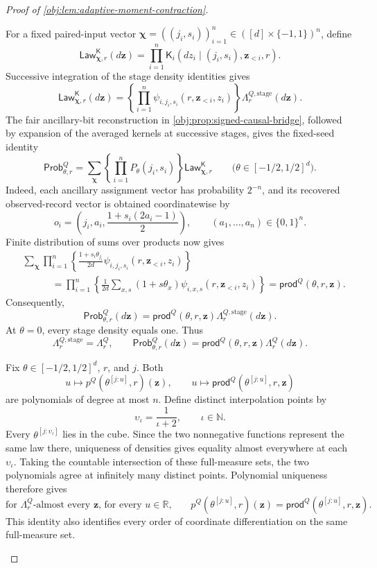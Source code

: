 \begin{proof}[Proof of \cref{obj:lem:adaptive-moment-contraction}]
\begin{enumerate}
For a fixed paired-input vector
\(\boldsymbol\chi=((j_i,s_i))_{i=1}^n
 \in([d]\times\{-1,1\})^n\), define
\[
\mathsf{Law}^{\mathsf K}_{\boldsymbol\chi,r}(d\mathbf z)
=\prod_{i=1}^n
 \mathsf K_i(dz_i\mid(j_i,s_i),\mathbf z_{<i},r).
\]
Successive integration of the stage density identities gives
\[
\mathsf{Law}^{\mathsf K}_{\boldsymbol\chi,r}(d\mathbf z)
=
\left\{\prod_{i=1}^n
 \psi_{i,j_i,s_i}(r,\mathbf z_{<i},z_i)\right\}
 \Lambda_r^{Q,\mathrm{stage}}(d\mathbf z).
\]
The fair ancillary-bit reconstruction in
\cref{obj:prop:signed-causal-bridge}, followed by expansion of the averaged kernels at successive stages, gives the fixed-seed identity
\[
\mathsf{Prob}^Q_{\theta,r}
=
\sum_{\boldsymbol\chi}
 \left\{\prod_{i=1}^nP_\theta(j_i,s_i)\right\}
 \mathsf{Law}^{\mathsf K}_{\boldsymbol\chi,r}
\qquad
\bigl(\theta\in[-1/2,1/2]^d\bigr).
\]
Indeed, each ancillary assignment vector has probability \(2^{-n}\), and its recovered observed-record vector is obtained coordinatewise by
\[
o_i
=\left(j_i,a_i,\frac{1+s_i(2a_i-1)}2\right),
\qquad
(a_1,\ldots,a_n)\in\{0,1\}^n.
\]
Finite distribution of sums over products now gives
\[
\begin{split}
&\sum_{\boldsymbol\chi}
 \prod_{i=1}^n
 \left\{
 \frac{1+s_i\theta_{j_i}}{2d}
 \psi_{i,j_i,s_i}(r,\mathbf z_{<i},z_i)
 \right\}\\
&\hspace{3em}
=\prod_{i=1}^n
 \left\{\frac1{2d}\sum_{x,s}
 (1+s\theta_x)\psi_{i,x,s}(r,\mathbf z_{<i},z_i)\right\}
=\mathsf{prod}^Q(\theta,r,\mathbf z).
\end{split}
\]
Consequently,
\[
\mathsf{Prob}^Q_{\theta,r}(d\mathbf z)
=\mathsf{prod}^Q(\theta,r,\mathbf z)
 \Lambda_r^{Q,\mathrm{stage}}(d\mathbf z).
\]
At \(\theta=0\), every stage density equals one. Thus
\[
\Lambda_r^{Q,\mathrm{stage}}=\Lambda_r^Q,
\qquad
\mathsf{Prob}^Q_{\theta,r}(d\mathbf z)
=\mathsf{prod}^Q(\theta,r,\mathbf z)\Lambda_r^Q(d\mathbf z).
\]

Fix \(\theta\in[-1/2,1/2]^d\), \(r\), and \(j\). Both
\[
u\longmapsto p^Q(\theta^{[j:u]},r)(\mathbf z),
\qquad
u\longmapsto\mathsf{prod}^Q(\theta^{[j:u]},r,\mathbf z)
\]
are polynomials of degree at most \(n\). Define distinct interpolation points by
\[
\upsilon_\iota=\frac1{\iota+2},
\qquad \iota\in\mathbb N.
\]
Every \(\theta^{[j:\upsilon_\iota]}\) lies in the cube. Since the two nonnegative functions represent the same law there, uniqueness of densities gives equality almost everywhere at each \(\upsilon_\iota\). Taking the countable intersection of these full-measure sets, the two polynomials agree at infinitely many distinct points. Polynomial uniqueness therefore gives
\[
\text{for \(\Lambda_r^Q\)-almost every \(\mathbf z\), for every \(u\in\mathbb R\),}\qquad
p^Q(\theta^{[j:u]},r)(\mathbf z)
=\mathsf{prod}^Q(\theta^{[j:u]},r,\mathbf z).
\]
This identity also identifies every order of coordinate differentiation on the same full-measure set.


\end{enumerate}
\end{proof}
